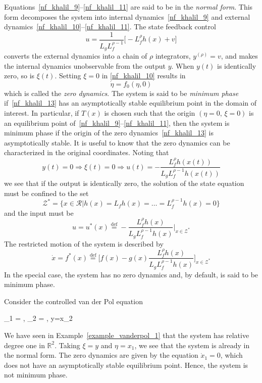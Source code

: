 \documentclass[12pt,a4paper,oneside]{book}
\begin{document}
\begin{onehalfspace}
Equations~\eqref{nf_khalil_9}--\eqref{nf_khalil_11} are said to be in the \textit{normal form}. This form decomposes the system into internal dynamics~\eqref{nf_khalil_9} and external dynamics~\eqref{nf_khalil_10}--\eqref{nf_khalil_11}. The state feedback control
\begin{equation*}
 u=\frac{1}{L_gL_f^{\rho-1}}\Big[-L_f^\rho h(x)+v\Big]
\end{equation*}
converts the external dynamics into a chain of $\rho$ integrators, $y^{(\rho)}=v$, and makes the internal dynamics unobservable from the output $y$. When $y(t)$ is identically zero, so is $\xi(t)$. Setting $\xi=0$ in \eqref{nf_khalil_10} results in
\begin{equation}\label{nf_khalil_13}
	\dot{\eta}=f_0(\eta,0)
\end{equation}
which is called the \textit{zero dynamics}. The system is said to be \textit{minimum phase} if~\eqref{nf_khalil_13} has an asymptotically stable equilibrium point in the domain of interest. In particular, if $T(x)$ is chosen such that the origin $(\eta=0,\,\xi=0)$ is an equilibrium point of~\eqref{nf_khalil_9}--\eqref{nf_khalil_11}, then the system is minimum phase if the origin of the zero dynamics~\eqref{nf_khalil_13} is asymptotically stable. It is useful to know that the zero dynamics can be characterized in the original coordinates. Noting that
\begin{equation*}
	y(t)=0\Rightarrow\xi(t)=0\Rightarrow u(t)=-\frac{L_f^\rho h(x(t))}{L_gL_f^{\rho-1}h(x(t))}
\end{equation*}
we see that if the output is identically zero, the solution of the state equation must be confined to the set
\begin{equation*}
	\mathscr{Z}^*=\big\{ x\in\mathscr{R}|h(x)=L_fh(x)=\dots=L_f^{\rho-1}h(x)=0\big\}
\end{equation*}
and the input must be
\begin{equation*}
	u=u^*(x)\stackrel{\text{def}}{=}-\frac{L_f^\rho h(x)}{L_gL_f^{\rho-1}h(x)}\Big|_{x\in\mathscr{Z}^*}
\end{equation*}
The restricted motion of the system is described by
\begin{equation*}
	\dot{x}=f^*(x)\stackrel{\text{def}}{=}\Big[f(x)-g(x)\frac{L_f^\rho h(x)}{L_gL_f^{\rho-1}h(x)}\Big]_{x\in\mathscr{Z}^*}
\end{equation*}
In the special case, the system has no zero dynamics and, by default, is said to be minimum phase.
\begin{example}
	Consider the controlled van der Pol equation
	\begin{flalign*}
		_1 = ,\qquad
		_2 = \epsilon{},\qquad
		y=x_2
	\end{flalign*}
We have seen in Example~\ref{example_vanderpol_1} that the system has relative degree one in $\mathbb{R}^2$. Taking $\xi=y$ and $\eta=x_1$, we see that the system is already in the normal form. The zero dynamics are given by the equation $\dot{x}_1=0$, which does not have an asymptotically stable equilibrium point. Hence, the system is not minimum phase. 


\end{example}
\end{onehalfspace}
\end{document}
